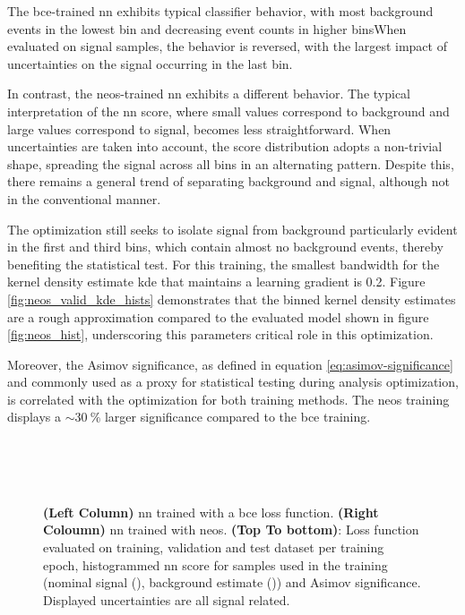 The \ac{bce}-trained \ac{nn} exhibits typical classifier behavior, with most background events in the lowest bin and decreasing event counts in higher binsWhen evaluated on signal samples, the behavior is reversed, with the largest impact of uncertainties on the signal occurring in the last bin.

In contrast, the \ac{neos}-trained \ac{nn} exhibits a different behavior. The typical interpretation of the \ac{nn} score, where small values correspond to background and large values correspond to signal, becomes less straightforward. When uncertainties are taken into account, the score distribution adopts a non-trivial shape, spreading the signal across all bins in an alternating pattern. Despite this, there remains a general trend of separating background and signal, although not in the conventional manner.

The optimization still seeks to isolate signal from background particularly evident in the first and third bins, which contain almost no background events, thereby benefiting the statistical test. For this training, the smallest bandwidth for the kernel density estimate \ac{kde} that maintains a learning gradient is 0.2. Figure \ref{fig:neos_valid_kde_hists} demonstrates that the binned kernel density estimates are a rough approximation compared to the evaluated model shown in figure \ref{fig:neos_hist}, underscoring this parameters critical role in this optimization.

Moreover, the Asimov significance, as defined in equation \ref{eq:asimov-significance} and commonly used as a proxy for statistical testing during analysis optimization, is correlated with the optimization for both training methods. The \ac{neos} training displays a $\sim\qty[]{30}{\percent}$ larger significance compared to the \ac{bce} training.

\begin{figure}
    \centering
     \label{fig:neos_validation_loss}\\
     \label{fig:neos_hist}\\
     \\
    \caption[]{\textbf{(Left Column)} \ac{nn} trained with a \ac{bce} loss function. \textbf{(Right Coloumn)} \ac{nn} trained with \ac{neos}.  \textbf{(Top To bottom)}: Loss function evaluated on training, validation and test dataset per training epoch, histogrammed \ac{nn} score for samples used in the training (nominal signal (), background estimate ()) and Asimov significance. Displayed uncertainties are all signal related.}
    \label{fig:training_metrics_validation}
\end{figure}


